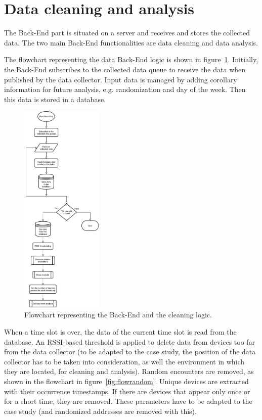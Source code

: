 \section{Data cleaning and analysis}
\label{sec:analysis}
\vspace{0.2 cm} 

The Back-End part is situated on a server and receives and stores the collected data. The two main Back-End functionalities are data cleaning and data analysis.

The flowchart representing the data Back-End logic is shown in figure~\ref{fig:flowcleaner}. Initially, the Back-End subscribes to the collected data queue to receive the data when published by the data collector. Input data is managed by adding corollary information for future analysis, e.g. randomization and day of the week. Then this data is stored in a database.

\begin{figure}[h]
\centering 
\includegraphics[width=0.35\textwidth]{images/flowcleaner} 
\caption{Flowchart representing the Back-End and the cleaning logic.}
\label{fig:flowcleaner}
\end{figure}

When a time slot is over, the data of the current time slot is read from the database. An RSSI-based threshold is applied to delete data from devices too far from the data collector (to be adapted to the case study, the position of the data collector has to be taken into consideration, as well the environment in which they are located, for cleaning and analysis). Random encounters are removed, as shown in the flowchart in figure~\ref{fig:flowrandom}. Unique devices are extracted with their occurrence timestamps. If there are devices that appear only once or for a short time, they are removed. These parameters have to be adapted to the case study (and randomized addresses are removed with this).

